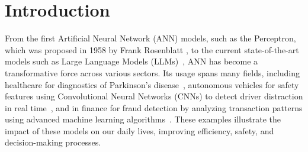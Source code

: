 \chapter{Introduction}\label{cap:intro}


From the first Artificial Neural Network (ANN) models, such as the Perceptron, which was proposed in 1958 by Frank Rosenblatt \cite {Rosenblatt1958}, to the current state-of-the-art models such as Large Language Models (LLMs)~\cite{OpenAI2023GPT4, guSurveyLLMasaJudge2025}, ANN has become a transformative force across various sectors. Its usage spans many fields, including healthcare for diagnostics of Parkinson's disease~\cite{Luo2025Efficient}, autonomous vehicles for safety features using Convolutional Neural Networks (CNNs) to detect driver distraction in real time~\cite{Lei2025An}, and in finance for fraud detection by analyzing transaction patterns using advanced machine learning algorithms~\cite{10859521}. These examples illustrate the impact of these models on our daily lives, improving efficiency, safety, and decision-making processes. 

